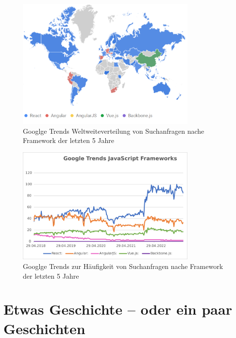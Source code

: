 \begin{figure}[!htb]
    \centering
    \includegraphics[width=0.8\textwidth]{img/Google Stats/2023-04-26 12_20_26-React, Angular, AngularJS, Vue.js, Backbone.js - Erkunden - Google Trends}
    \caption{Googlge Trends Weltweiteverteilung von Suchanfragen nache Framework der letzten 5 Jahre}
    \label{fig:google_trends_world}
\end{figure}

\begin{figure}[!htb]
    \centering
    \includegraphics[width=0.8\textwidth]{img/Google Stats/google_frameworks_trends}
    \caption{Googlge Trends zur Häufigkeit von Suchanfragen nache Framework der letzten 5 Jahre}
    \label{fig:google_trends}
\end{figure}

\section{Etwas Geschichte -- oder ein paar Geschichten}

